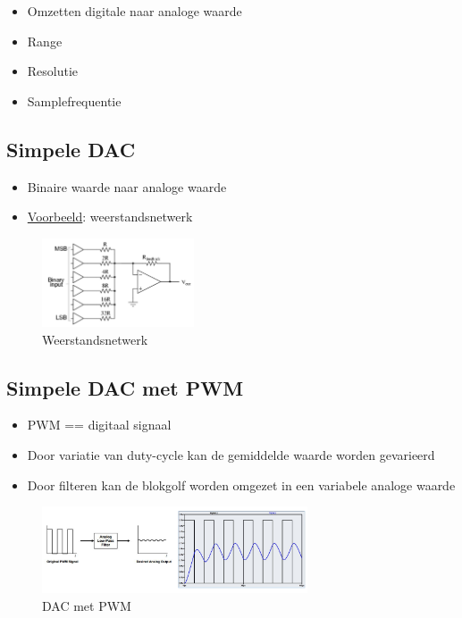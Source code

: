 \documentclass{article}
\begin{document}
\begin{itemize}
    \item Omzetten digitale naar analoge waarde
    \item Range
    \item Resolutie
    \item Samplefrequentie
\end{itemize}

\subsection{Simpele DAC}
\begin{itemize}
    \item Binaire waarde naar analoge waarde
    \item \underline{Voorbeeld}: weerstandsnetwerk
\end{itemize}

\begin{figure}[H]
    \centering
    \includegraphics[width=0.4\textwidth]{Screenshot_20200224_123043.png}
    \caption{Weerstandsnetwerk}
\end{figure}

\subsection{Simpele DAC met PWM}
\begin{itemize}
    \item PWM == digitaal signaal
    \item Door variatie van duty-cycle kan de gemiddelde waarde worden gevarieerd
    \item Door filteren kan de blokgolf worden omgezet in een variabele analoge waarde 
\end{itemize}

\begin{figure}[H]
    \centering
    \includegraphics[width=0.7\textwidth]{Screenshot_20200224_123240.png}
    \caption{DAC met PWM}
\end{figure}
\end{document}
